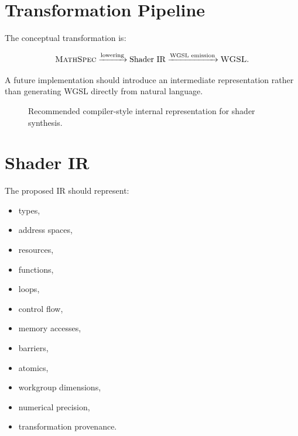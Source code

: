 \documentclass[11pt,a4paper,oneside]{report}
\newcommand{\WGSL}{\textsc{WGSL}}
\newcommand{\MathSpec}{\textsc{MathSpec}}
\begin{document}
\section{Transformation Pipeline}

The conceptual transformation is:

\[
\MathSpec
\xrightarrow{\text{lowering}}
\text{Shader IR}
\xrightarrow{\text{WGSL emission}}
\WGSL.
\]

A future implementation should introduce an intermediate representation rather than generating
WGSL directly from natural language.

\begin{figure}[H]
\centering
{}
\caption{Recommended compiler-style internal representation for shader synthesis.}
\end{figure}

\section{Shader IR}

The proposed IR should represent:

\begin{itemize}
  \item types,
  \item address spaces,
  \item resources,
  \item functions,
  \item loops,
  \item control flow,
  \item memory accesses,
  \item barriers,
  \item atomics,
  \item workgroup dimensions,
  \item numerical precision,
  \item transformation provenance.
\end{itemize}
\end{document}
